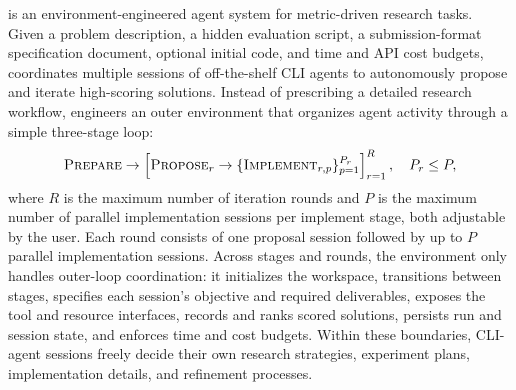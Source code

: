 \documentclass{article} %
\begin{document}
   \method is an environment-engineered agent system for metric-driven research tasks. 
   Given a problem description, a hidden evaluation script, a submission-format specification document, optional initial code, and time and API cost budgets, \method 
   coordinates multiple sessions of off-the-shelf CLI agents 
   to autonomously propose and iterate high-scoring solutions. 
   Instead of prescribing a detailed research workflow,
   \method engineers an outer environment that organizes agent activity through a simple three-stage loop:
     \[
     \textsc{Prepare} \rightarrow
     \left[
     \textsc{Propose}_{r}
     \rightarrow
     \{\textsc{Implement}_{r,p}\}_{p=1}^{P_r}
     \right]_{r=1}^{R}, \quad P_r \le P ,
     \]
   where \(R\) is the maximum number of 
   iteration rounds
   and \(P\) is the maximum number of parallel implementation sessions per implement stage, both adjustable by the user.
   Each round consists of one proposal session followed by up to \(P\) parallel implementation sessions. 
   Across stages and rounds, the environment only handles outer-loop coordination: it initializes the workspace, transitions between stages, specifies each session's objective and required deliverables, exposes the tool and resource interfaces, records and ranks scored solutions, persists run and session state, and enforces time and cost budgets. Within these boundaries, CLI-agent sessions freely decide their own research strategies, experiment plans, implementation details, and refinement processes.
   
   
   
\end{document}

